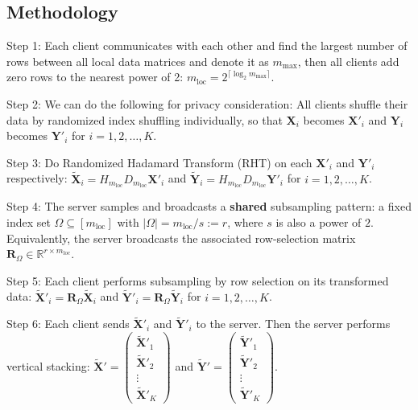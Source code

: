 \documentclass[11pt]{article}
\numberwithin{equation}{section}
\theoremstyle{plain}
\theoremstyle{definition}
\theoremstyle{remark}
\begin{document}
\subsection{Methodology}
\begin{algorithm}[H]
\caption{Distributed Global Subsampled Randomized Hadamard Transform (DGSRHT)}
\label{alg:example}
\BlankLine
Step 1: Each client communicates with each other and find the largest number of rows between all local data matrices and denote it as $m_{\max}$, then all clients add zero rows to the nearest power of 2: $m_{\mathrm{loc}} = 2^{\lceil \log_2 m_{\max} \rceil}$.

Step 2:
We can do the following for privacy consideration: All clients shuffle their data by randomized index shuffling individually, so that $\mathbf{X}_i$ becomes $\mathbf{X}'_i$ and $\mathbf{Y}_i$ becomes $\mathbf{Y}'_i$ for $i = 1,2,\ldots, K$.

Step 3: Do Randomized Hadamard Transform (RHT) on each $\mathbf{X}'_i$ and $\mathbf{Y}'_i$ respectively:
$\mathbf{\tilde{X}}_i = H_{m_\mathrm{loc}}D_{m_\mathrm{loc}}\mathbf{X}'_i$ and
$\mathbf{\tilde{Y}}_i = H_{m_\mathrm{loc}}D_{m_\mathrm{loc}}\mathbf{Y}'_i$
for $i = 1,2,\ldots, K$.

Step 4: The server samples and broadcasts a \textbf{shared} subsampling pattern:
a fixed index set $\Omega \subseteq [m_{\mathrm{loc}}]$ with $|\Omega| = m_{\mathrm{loc}}/s := r$,
where $s$ is also a power of $2$.
Equivalently, the server broadcasts the associated row-selection matrix
$\mathbf{R}_{\Omega}\in\mathbb{R}^{r\times m_{\mathrm{loc}}}$.

Step 5: Each client performs subsampling by row selection on its transformed data:
$\mathbf{\tilde{X}}'_i = \mathbf{R}_{\Omega}\mathbf{\tilde{X}}_i$ and
$\mathbf{\tilde{Y}}'_i = \mathbf{R}_{\Omega}\mathbf{\tilde{Y}}_i$
for $i = 1,2,\ldots, K$.

Step 6: Each client sends $\mathbf{\tilde{X}}'_i$ and $\mathbf{\tilde{Y}}'_i$ to the server.
Then the server performs vertical stacking:
$\mathbf{\tilde{X}}' = \begin{pmatrix} \mathbf{\tilde{X}}'_1 \\ \mathbf{\tilde{X}}'_2 \\ \vdots \\ \mathbf{\tilde{X}}'_K \end{pmatrix}$
and
$\mathbf{\tilde{Y}}' = \begin{pmatrix} \mathbf{\tilde{Y}}'_1 \\ \mathbf{\tilde{Y}}'_2 \\ \vdots \\ \mathbf{\tilde{Y}}'_K \end{pmatrix}$.


\end{algorithm}
\end{document}

